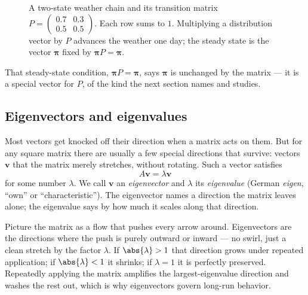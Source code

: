\begin{figure}[H]
\centering
{}
\caption{A two-state weather chain and its transition matrix $P=\left(\begin{smallmatrix} 0.7 & 0.3
\\ 0.5 & 0.5 \end{smallmatrix}\right)$. Each row sums to $1$. Multiplying a distribution vector by $P$
advances the weather one day; the steady state is the vector $\boldsymbol\pi$ fixed by $\boldsymbol\pi
P=\boldsymbol\pi$.}
\label{chAcla:fig-markov}
\end{figure}

That steady-state condition, $\boldsymbol\pi P = \boldsymbol\pi$, says $\boldsymbol\pi$ is unchanged by
the matrix --- it is a special vector for $P$, of the kind the next section names and studies.

\subsection{Eigenvectors and eigenvalues}
\label{chAcla:eigen}

Most vectors get knocked off their direction when a matrix acts on them. But for any square matrix
there are usually a few special directions that survive: vectors $\mathbf{v}$ that the matrix merely
stretches, without rotating. Such a vector satisfies
\[
  A\mathbf{v} = \lambda\mathbf{v}
\]
for some number $\lambda$. We call $\mathbf{v}$ an \emph{eigenvector} and $\lambda$ its
\emph{eigenvalue} (German \emph{eigen}, ``own'' or ``characteristic''). The eigenvector names a
direction the matrix leaves alone; the eigenvalue says by how much it scales along that direction.

\begin{intuitionbox}
Picture the matrix as a flow that pushes every arrow around. Eigenvectors are the directions where the
push is purely outward or inward --- no swirl, just a clean stretch by the factor $\lambda$. If
$\abs{\lambda}>1$ that direction grows under repeated application; if $\abs{\lambda}<1$ it shrinks; if
$\lambda=1$ it is perfectly preserved. Repeatedly applying the matrix amplifies the largest-eigenvalue
direction and washes the rest out, which is why eigenvectors govern long-run behavior.
\end{intuitionbox}

